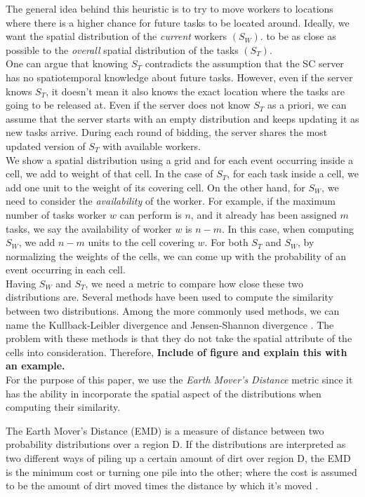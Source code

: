 The general idea behind this heuristic is to try to move workers to locations where there is a higher chance for future tasks to be located around. Ideally, we want the spatial distribution of the \textit{current} workers $(S_W)$. to be as close as possible to the \textit{overall} spatial distribution of the tasks $(S_T)$.\\
One can argue that knowing $S_T$ contradicts the assumption that the SC server has no spatiotemporal knowledge about future tasks. However, even if the server knows $S_T$, it doesn't mean it also knows the exact location where the tasks are going to be released at. Even if the server does not know $S_T$ as a priori, we can assume that the server starts with an empty distribution and keeps updating it as new tasks arrive. During each round of bidding, the server shares the most updated version of $S_T$ with available workers.\\
We show a spatial distribution using a grid and for each event occurring inside a cell, we add to weight of that cell. In the case of $S_T$, for each task inside a cell, we add one unit to the weight of its covering cell. On the other hand, for $S_W$, we need to consider the \textit{availability} of the worker. For example, if the maximum number of tasks worker $w$ can perform is $n$, and it already has been assigned $m$ tasks, we say the availability of worker $w$ is $n-m$. In this case, when computing $S_W$, we add $n-m$ units to the cell covering $w$. For both $S_T$ and $S_W$, by normalizing the weights of the cells, we can come up with the probability of an event occurring in each cell.\\
Having $S_W$ and $S_T$, we need a metric to compare how close these two distributions are. Several methods have been used to compute the similarity between two distributions. Among the more commonly used methods, we can name the Kullback-Leibler divergence \cite{Kullback51} and Jensen-Shannon divergence \cite{Lin91}. The problem with these methods is that they do not take the spatial attribute of the cells into consideration. Therefore, \textbf{Include of figure and explain this with an example.}\\
For the purpose of this paper, we use the \textit{Earth Mover's Distance} metric since it has the ability in incorporate the spatial aspect of the distributions when computing their similarity.

\begin{definition}
The Earth Mover's Distance (EMD) is a measure of distance between two probability distributions over a region D. If the distributions are interpreted as two different ways of piling up a certain amount of dirt over region D, the EMD is the minimum cost or turning one pile into the other; where the cost is assumed to be the amount of dirt moved times the distance by which it's moved \cite{Rubner98}.
\end{definition}

